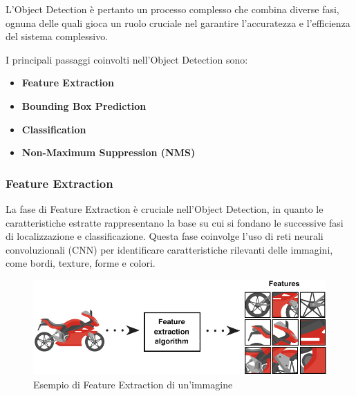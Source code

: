 L'Object Detection è pertanto un processo complesso che combina diverse fasi, ognuna delle quali gioca un ruolo cruciale nel garantire l'accuratezza e l'efficienza del sistema complessivo.

I principali passaggi coinvolti nell'Object Detection sono:
\begin{itemize}
  \item \textbf{Feature Extraction}
  \item \textbf{Bounding Box Prediction}
  \item \textbf{Classification}
  \item \textbf{Non-Maximum Suppression (NMS)}
\end{itemize}

\subsubsection{Feature Extraction}
La fase di Feature Extraction è cruciale nell'Object Detection, in quanto le caratteristiche estratte rappresentano la base su cui si fondano le successive fasi di localizzazione e classificazione. Questa fase coinvolge l'uso di reti neurali convoluzionali (CNN) per identificare caratteristiche rilevanti delle immagini, come bordi, texture, forme e colori.

\begin{figure}[ht]
    \centering
    \includegraphics[width=1\textwidth]{files/capitoli/1-object-detection/assets/feature-extraction.png}
    \caption{\label{fig:feature-extraction}Esempio di Feature Extraction di un'immagine\cite{2}}
\end{figure}

\newpage

